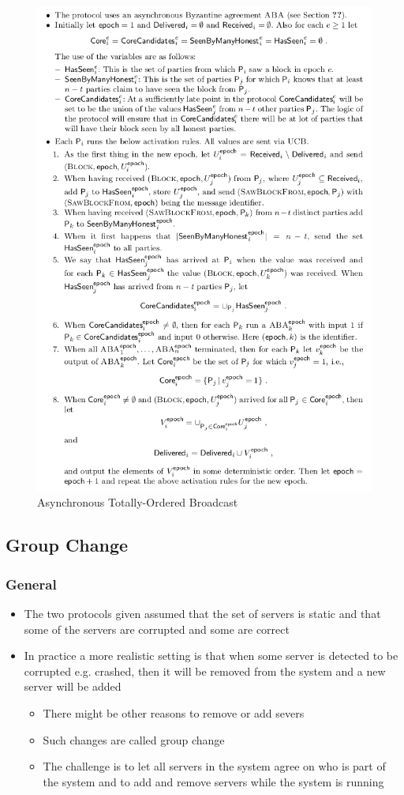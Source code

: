 \documentclass[11pt]{article}
\begin{document}
\begin{figure}[htbp]
\centering
\includegraphics[width=.9\linewidth]{State Machine Replication (10)/screenshot_2018-10-21_10-51-18.png}
\caption{\label{fig:orge2c5b39}
Asynchronous Totally-Ordered Broadcast}
\end{figure}

\subsection{Group Change}
\label{sec:org269db4f}
\subsubsection{General}
\label{sec:orgaa69c54}
\begin{itemize}
\item The two protocols given assumed that the set of servers is static and that some of the servers are corrupted and some are correct
\item In practice a more realistic setting is that when some server is detected to be corrupted e.g. crashed, then it will be removed from the system and a new server will be added
\begin{itemize}
\item There might be other reasons to remove or add severs
\item Such changes are called group change
\item The challenge is to let all servers in the system agree on who is part of the system and to add and remove servers while the system is running
\end{itemize}
\end{itemize}
\end{document}
